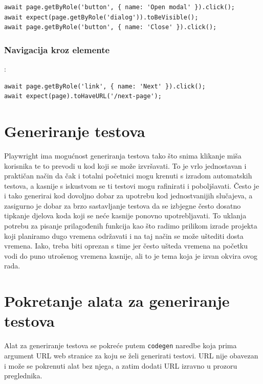 \begin{verbatim}
await page.getByRole('button', { name: 'Open modal' }).click();
await expect(page.getByRole('dialog')).toBeVisible();
await page.getByRole('button', { name: 'Close' }).click();
\end{verbatim}

\subsubsection*{Navigacija kroz elemente}:

\begin{verbatim}
await page.getByRole('link', { name: 'Next' }).click();
await expect(page).toHaveURL('/next-page');
\end{verbatim}


\section{Generiranje testova}
Playwright ima mogućnost generiranja testova tako što snima klikanje miša korisnika te to prevodi u kod koji se može izvršavati.
To je vrlo jednostavan i praktičan način da čak i totalni početnici mogu krenuti s izradom automatskih testova, a kasnije s iskustvom se ti testovi mogu rafinirati i poboljšavati.
Često je i tako generirai kod dovoljno dobar za upotrebu kod jednostvanijih slučajeva, a zasigurno je dobar za brzo sastavljanje testova da se izbjegne često dosatno tipkanje djelova koda koji se neće kasnije ponovno upotrebljavati.
To uklanja potrebu za pisanje prilagođenih funkcija kao što radimo prilikom izrade projekta koji planiramo dugo vremena održavati i na taj način se može uštediti dosta vremena.
Iako, treba biti oprezan s time jer često ušteda vremena na početku vodi do puno utrošenog vremena kasnije, ali to je tema koja je izvan okvira ovog rada.
\section{Pokretanje alata za generiranje testova}

Alat za generiranje testova se pokreće putem \texttt{codegen} naredbe koja prima argument URL web stranice za koju se želi generirati testovi.
URL nije obavezan i može se pokrenuti alat bez njega, a zatim dodati URL izravno u prozoru preglednika.

